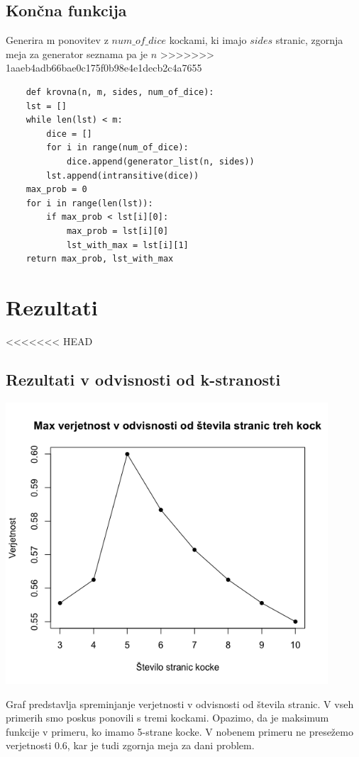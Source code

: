\documentclass[12pt,a4paper]{amsart}
\begin{document}
 \subsection{Končna funkcija}
 Generira m ponovitev z $num\_of\_dice$ kockami, ki imajo $sides$ stranic, zgornja meja za generator seznama pa je $n$
>>>>>>> 1aaeb4adb66bae0c175f0b98e4e1decb2c4a7655
 \begin{verbatim}
    def krovna(n, m, sides, num_of_dice):  
    lst = []
    while len(lst) < m: 
        dice = []
        for i in range(num_of_dice):
            dice.append(generator_list(n, sides))
        lst.append(intransitive(dice))
    max_prob = 0
    for i in range(len(lst)):
        if max_prob < lst[i][0]:
            max_prob = lst[i][0]
            lst_with_max = lst[i][1]
    return max_prob, lst_with_max
 \end{verbatim}

 \section{Rezultati}
<<<<<<< HEAD

 \subsection{Rezultati v odvisnosti od k-stranosti}
 \begin{center}
    \includegraphics*[width=120mm]{st_stranic.png}
 \end{center}
 Graf predstavlja spreminjanje verjetnosti v odvisnosti od števila stranic. V vseh primerih smo poskus ponovili s tremi kockami. Opazimo, da je maksimum funkcije v primeru, ko imamo 5-strane kocke. V nobenem primeru ne presežemo verjetnosti 0.6, kar je tudi zgornja meja za dani problem.
 
\end{document}
